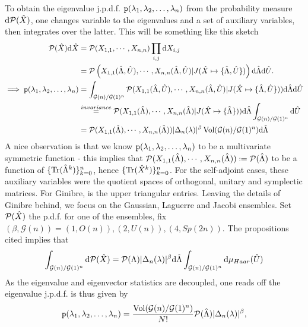 To obtain the eigenvalue j.p.d.f. $\mathtt{p}(\lambda_1, \lambda_2, \dots, \lambda_n)$ from the probability measure $\mathrm{d} \mathcal{P}(\hat X)$, one changes variable to the eigenvalues and a set of auxiliary variables, then integrates over the latter. This will be something like this sketch
\begin{equation}
	\begin{split}
		\mathcal{P}(\hat X) \mathrm{d} \hat X & = \mathcal{P}(X_{1,1}, \cdots , X_{n,n}) \prod_{i,j} \mathrm{d} X_{i,j} \\
		& = \mathcal{P} \left(X_{1,1}(\hat\Lambda, \hat U), \cdots , X_{n,n}(\hat\Lambda, \hat U) | J(\hat X \mapsto \{\hat\Lambda, \hat U\})\right) \mathrm{d} \hat\Lambda \mathrm{d} \hat U. \\
		\implies \mathtt{p}(\lambda_1, \lambda_2, \dots, \lambda_n) & = \int_{\mathcal{G}(n)/\mathcal{G}(1)^n} \mathcal{P}(X_{1,1}(\hat\Lambda, \hat U), \cdots , X_{n,n}(\hat\Lambda, \hat U)| J(\hat X \mapsto \{\hat\Lambda, \hat U\})) \mathrm{d} \hat\Lambda \mathrm{d} \hat U \\
		& \stackrel{invariance}{=} \mathcal{P}(X_{1,1}(\hat\Lambda), \cdots , X_{n,n}(\hat\Lambda)| J(\hat X \mapsto \{\hat\Lambda\})) \mathrm{d} \hat\Lambda \int_{\mathcal{G}(n)/\mathcal{G}(1)^n} \mathrm{d} \hat U \\
		& = \mathcal{P}(X_{1,1}(\hat\Lambda), \cdots , X_{n,n}(\hat\Lambda)) |\Delta_n(\lambda)|^\beta \operatorname{Vol}(\mathcal{G}(n)/\mathcal{G}(1)^n) \mathrm{d} \hat\Lambda
	\end{split}
\end{equation}
A nice observation is that we know $\mathtt{p}(\lambda_1, \lambda_2, \dots, \lambda_n)$ to be a multivariate symmetric function - this implies that $\eP(X_{1,1}(\m{\Lambda}), \cdots , X_{n,n}(\m{\Lambda})) \deff \eP(\m{\Lambda})$ to be a function of $\{\operatorname{Tr}(\hat\Lambda^k)\}_{k=0}^{n}$, hence $\{\operatorname{Tr}(\hat X^k)\}_{k=0}^{n}$. For the self-adjoint cases, these auxiliary variables were the quotient spaces of orthogonal, unitary and symplectic matrices. For Ginibre, is the upper triangular entries. Leaving the details of Ginibre behind, we focus on the Gaussian, Laguerre and Jacobi ensembles. Set $\mathcal{P}(\hat X)$ the p.d.f. for one of the ensembles, fix $(\beta,\mathcal{G}(n)) = (1, O(n)), (2, U(n)), (4, Sp(2n))$. The propositions cited implies that
\begin{equation}
	\int_{\mathcal{G}(n)/\mathcal{G}(1)^n} \mathrm{d} \mathcal{P}(\hat X) = \mathcal{P}(\Lambda) |\Delta_n(\lambda)|^\beta \mathrm{d} \hat\Lambda \int_{\mathcal{G}(n)/\mathcal{G}(1)^n} \mathrm{d} \mu_{Haar}(\hat U)
\end{equation}
As the eigenvalue and eigenvector statistics are decoupled, one reads off the eigenvalue j.p.d.f. is thus given by 
\begin{equation}
	\mathtt{p}(\lambda_1, \lambda_2, \dots, \lambda_n) = \frac{\operatorname{Vol}(\mathcal{G}(n)/\mathcal{G}(1)^n)}{N!} \mathcal{P}(\hat\Lambda) |\Delta_n(\lambda)|^\beta,
\end{equation}
